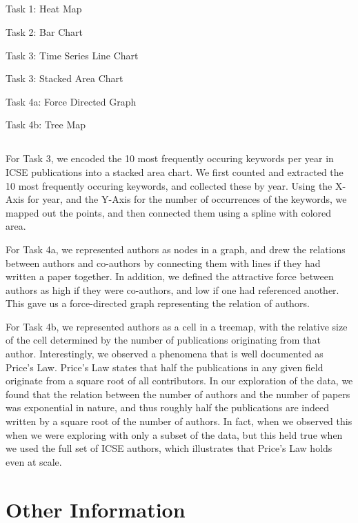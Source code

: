 \documentclass{article}
\begin{document}
\subsection{}
Task 1: Heat Map

Task 2: Bar Chart

Task 3: Time Series Line Chart

Task 3: Stacked Area Chart

Task 4a: Force Directed Graph

Task 4b: Tree Map

\subsection{}
For Task 3, we encoded the 10 most frequently occuring keywords per year in ICSE publications into a stacked area chart. We first counted and extracted the 10 most frequently occuring keywords, and collected these by year. Using the X-Axis for year, and the Y-Axis for the number of occurrences of the keywords, we mapped out the points, and then connected them using a spline with colored area.

For Task 4a, we represented authors as nodes in a graph, and drew the relations between authors and co-authors by connecting them with lines if they had written a paper together. In addition, we defined the attractive force between authors as high if they were co-authors, and low if one had referenced another. This gave us a force-directed graph representing the relation of authors. 

For Task 4b, we represented authors as a cell in a treemap, with the relative size of the cell determined by the number of publications originating from that author. Interestingly, we observed a phenomena that is well documented as Price's Law. Price's Law states that half the publications in any given field originate from a square root of all contributors. In our exploration of the data, we found that the relation between the number of authors and the number of papers was exponential in nature, and thus roughly half the publications are indeed written by a square root of the number of authors. In fact, when we observed this when we were exploring with only a subset of the data, but this held true when we used the full set of ICSE authors, which illustrates that Price's Law holds even at scale. 

\section{Other Information}
\end{document}
